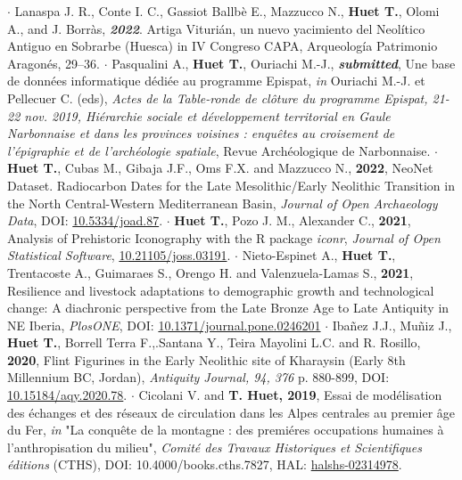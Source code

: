 \documentclass{article}
\begin{document}
\smallbreak
$\cdot$ Lanaspa J. R., Conte I. C., Gassiot Ballbè E., Mazzucco N., \textbf{Huet T.}, Olomi A., and J. Borràs, \textit{\textbf{2022}}. Artiga Viturián, un nuevo yacimiento del Neolítico Antiguo en Sobrarbe (Huesca) in IV Congreso CAPA, Arqueología Patrimonio Aragonés, 29–36.
\smallbreak
$\cdot$ Pasqualini A., \textbf{Huet T.}, Ouriachi M.-J., \textit{\textbf{submitted}}, Une base de données informatique dédiée au programme Epispat, \textit{in} Ouriachi M.-J. et Pellecuer C. (eds), \textit{Actes de la Table-ronde de cl\^{o}ture du programme Epispat, 21-22 nov. 2019, Hi\'{e}rarchie sociale et d\'{e}veloppement territorial en Gaule Narbonnaise et dans les provinces voisines : enqu\^{e}tes au croisement de l'\'{e}pigraphie et de l'arch\'{e}ologie spatiale}, Revue Arch\'{e}ologique de Narbonnaise.
\smallbreak
$\cdot$ \textbf{Huet T.}, Cubas M., Gibaja J.F., Oms F.X. and Mazzucco N., \textbf{2022}, NeoNet Dataset. Radiocarbon Dates for the Late Mesolithic/Early Neolithic Transition in the North Central-Western Mediterranean Basin, \textit{Journal of Open Archaeology Data}, DOI: \href{http://doi.org/10.5334/joad.87}{10.5334/joad.87}.
\smallbreak
$\cdot$ \textbf{Huet T.}, Pozo J. M., Alexander C., \textbf{2021}, Analysis of Prehistoric Iconography with the R package \textit{iconr}, \textit{Journal of Open Statistical Software}, \href{https://joss.theoj.org/papers/10.21105/joss.03191}{10.21105/joss.03191}.
\smallbreak
$\cdot$ Nieto-Espinet A., \textbf{Huet T.}, Trentacoste A., Guimaraes S., Orengo H. and Valenzuela-Lamas S., \textbf{2021}, Resilience and livestock adaptations to demographic growth and technological change: A diachronic perspective from the Late Bronze Age to Late Antiquity in NE Iberia, \textit{PlosONE}, DOI: \href{https://doi.org/10.1371/journal.pone.0246201}{10.1371/journal.pone.0246201}
\smallbreak
$\cdot$ Iba\~{n}ez J.J., Mu\~{n}iz J., \textbf{Huet T.}, Borrell Terra F.,.Santana Y., Teira Mayolini L.C. and R. Rosillo, \textbf{2020}, Flint Figurines in the Early Neolithic site of Kharaysin (Early 8th Millennium BC, Jordan), \textit{Antiquity Journal, 94, 376} p. 880-899, DOI: \href{https://doi.org/10.15184/aqy.2020.78}{10.15184/aqy.2020.78}.
\smallbreak
$\cdot$ Cicolani V. and \textbf{T. Huet, 2019}, Essai de mod\'{e}lisation des \'{e}changes et des r\'{e}seaux de circulation dans les Alpes centrales au premier \^{a}ge du Fer, \textit{in} "La conqu\^{e}te de la montagne : des premi\'{e}res occupations humaines \`{a} l'anthropisation du milieu", \textit{Comit\'{e} des Travaux Historiques et Scientifiques \'{e}ditions} (CTHS), DOI: 10.4000/books.cths.7827, HAL: \href{https://halshs.archives-ouvertes.fr/halshs-02314978/document}{halshs-02314978}.
\end{document}
